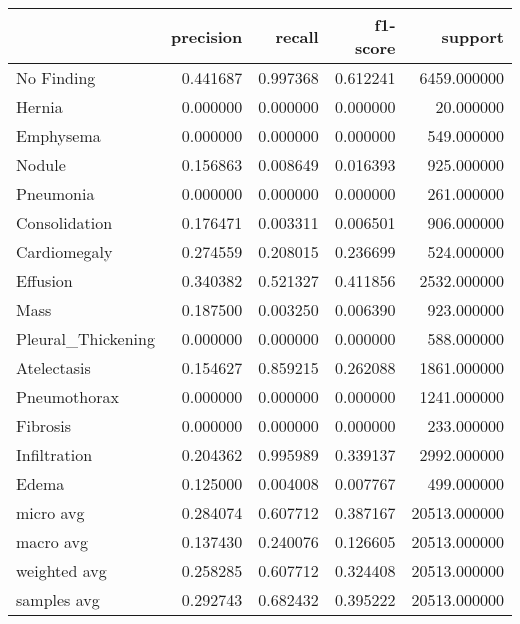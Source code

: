 \begin{tabular}{lrrrr}
\toprule
 & precision & recall & f1-score & support \\
\midrule
No Finding & 0.441687 & 0.997368 & 0.612241 & 6459.000000 \\
Hernia & 0.000000 & 0.000000 & 0.000000 & 20.000000 \\
Emphysema & 0.000000 & 0.000000 & 0.000000 & 549.000000 \\
Nodule & 0.156863 & 0.008649 & 0.016393 & 925.000000 \\
Pneumonia & 0.000000 & 0.000000 & 0.000000 & 261.000000 \\
Consolidation & 0.176471 & 0.003311 & 0.006501 & 906.000000 \\
Cardiomegaly & 0.274559 & 0.208015 & 0.236699 & 524.000000 \\
Effusion & 0.340382 & 0.521327 & 0.411856 & 2532.000000 \\
Mass & 0.187500 & 0.003250 & 0.006390 & 923.000000 \\
Pleural_Thickening & 0.000000 & 0.000000 & 0.000000 & 588.000000 \\
Atelectasis & 0.154627 & 0.859215 & 0.262088 & 1861.000000 \\
Pneumothorax & 0.000000 & 0.000000 & 0.000000 & 1241.000000 \\
Fibrosis & 0.000000 & 0.000000 & 0.000000 & 233.000000 \\
Infiltration & 0.204362 & 0.995989 & 0.339137 & 2992.000000 \\
Edema & 0.125000 & 0.004008 & 0.007767 & 499.000000 \\
micro avg & 0.284074 & 0.607712 & 0.387167 & 20513.000000 \\
macro avg & 0.137430 & 0.240076 & 0.126605 & 20513.000000 \\
weighted avg & 0.258285 & 0.607712 & 0.324408 & 20513.000000 \\
samples avg & 0.292743 & 0.682432 & 0.395222 & 20513.000000 \\
\bottomrule
\end{tabular}
